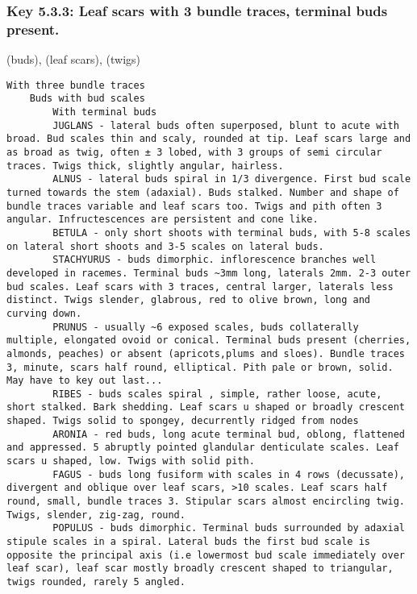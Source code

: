 \documentclass[openany]{book}
\begin{document}
\hypertarget{key-5.3.3-leaf-scars-with-3-bundle-traces-terminal-buds-present.}{%
\subsubsection{Key 5.3.3: Leaf scars with 3 bundle traces, terminal buds
present.}\label{key-5.3.3-leaf-scars-with-3-bundle-traces-terminal-buds-present.}}

(buds), (leaf scars), (twigs)

\begin{verbatim}
With three bundle traces
    Buds with bud scales
        With terminal buds
        JUGLANS - lateral buds often superposed, blunt to acute with broad. Bud scales thin and scaly, rounded at tip. Leaf scars large and as broad as twig, often ± 3 lobed, with 3 groups of semi circular traces. Twigs thick, slightly angular, hairless.
        ALNUS - lateral buds spiral in 1/3 divergence. First bud scale turned towards the stem (adaxial). Buds stalked. Number and shape of bundle traces variable and leaf scars too. Twigs and pith often 3 angular. Infructescences are persistent and cone like.
        BETULA - only short shoots with terminal buds, with 5-8 scales on lateral short shoots and 3-5 scales on lateral buds.
        STACHYURUS - buds dimorphic. inflorescence branches well developed in racemes. Terminal buds ~3mm long, laterals 2mm. 2-3 outer bud scales. Leaf scars with 3 traces, central larger, laterals less distinct. Twigs slender, glabrous, red to olive brown, long and curving down.
        PRUNUS - usually ~6 exposed scales, buds collaterally multiple, elongated ovoid or conical. Terminal buds present (cherries, almonds, peaches) or absent (apricots,plums and sloes). Bundle traces 3, minute, scars half round, elliptical. Pith pale or brown, solid. May have to key out last...
        RIBES - buds scales spiral , simple, rather loose, acute, short stalked. Bark shedding. Leaf scars u shaped or broadly crescent shaped. Twigs solid to spongey, decurrently ridged from nodes 
        ARONIA - red buds, long acute terminal bud, oblong, flattened and appressed. 5 abruptly pointed glandular denticulate scales. Leaf scars u shaped, low. Twigs with solid pith.
        FAGUS - buds long fusiform with scales in 4 rows (decussate), divergent and oblique over leaf scars, >10 scales. Leaf scars half round, small, bundle traces 3. Stipular scars almost encircling twig. Twigs, slender, zig-zag, round.
        POPULUS - buds dimorphic. Terminal buds surrounded by adaxial stipule scales in a spiral. Lateral buds the first bud scale is opposite the principal axis (i.e lowermost bud scale immediately over leaf scar), leaf scar mostly broadly crescent shaped to triangular, twigs rounded, rarely 5 angled.

\end{verbatim}
\end{document}
